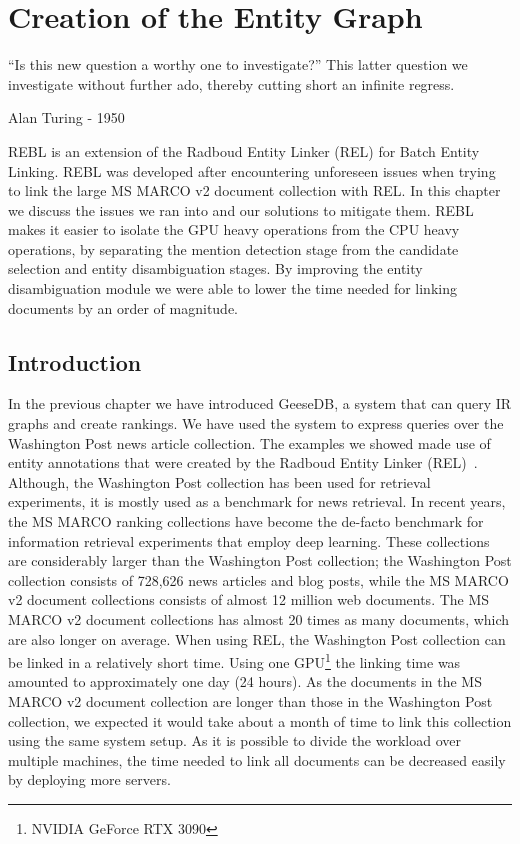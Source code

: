 \chapter{Creation of the Entity Graph}
\label{a-graph-of-entities}

\epigraph{``Is this new question a worthy one to investigate?'' This latter question we investigate without further ado, thereby cutting short an infinite regress.}{Alan Turing - 1950}


\begin{Abstract}
	\begin{changemargin}{1cm}{1cm}
		REBL is an extension of the Radboud Entity Linker (REL) for Batch Entity Linking. 
		REBL was developed after encountering unforeseen issues when trying to link the large MS MARCO v2 document collection with REL. In this chapter we discuss the issues we ran into and our solutions to mitigate them. REBL makes it easier to isolate the GPU heavy operations from the CPU heavy operations, by separating the mention detection stage from the candidate selection and entity disambiguation stages. By improving the entity disambiguation module we were able to lower the time needed for linking documents by an order of magnitude.
	\end{changemargin}
\end{Abstract}

\section{Introduction}
In the previous chapter we have introduced GeeseDB, a system that can query IR graphs and create rankings. We have used the system to express queries over the Washington Post news article collection. The examples we showed made use of entity annotations that were created by the Radboud Entity Linker (REL)~\citep{rel}.
Although, the Washington Post collection has been used for retrieval experiments, it is mostly used as a benchmark for news retrieval. 
In recent years, the MS MARCO ranking collections have become the de-facto benchmark for information retrieval experiments that employ deep learning. These collections are considerably larger than the Washington Post collection; the Washington Post collection consists of 728,626 news articles and blog posts, while the MS MARCO v2 document collections consists of almost 12 million web documents. The MS MARCO v2 document collections has almost 20 times as many documents, which are also longer on average.
When using REL, the Washington Post collection can be linked in a relatively short time. Using one GPU\footnote{NVIDIA GeForce RTX 3090} the linking time was amounted to approximately one day (24 hours). As the documents in the MS MARCO v2 document collection are longer than those in the Washington Post collection, we expected it would take about a month of time to link this collection using the same system setup. As it is possible to divide the workload over multiple machines, the time needed to link all documents can be decreased easily by deploying more servers. 

